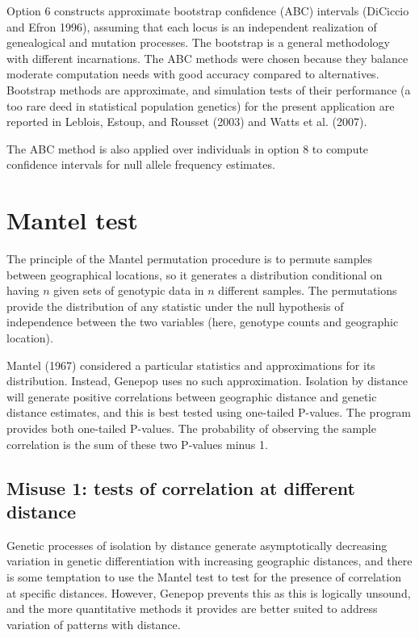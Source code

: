 \documentclass[12pt,]{book}
\theoremstyle{definition}
\theoremstyle{definition}
\theoremstyle{definition}
\theoremstyle{remark}
\begin{document}
 Option 6 constructs approximate
bootstrap confidence (ABC) intervals (DiCiccio and Efron 1996), assuming
that each locus is an independent realization of genealogical and
mutation processes. The bootstrap is a general methodology with
different incarnations. The ABC methods were chosen because they balance
moderate computation needs with good accuracy compared to alternatives.
Bootstrap methods are approximate, and simulation tests of their
performance (a too rare deed in statistical population genetics) for the
present application are reported in Leblois, Estoup, and Rousset (2003)
and Watts et al. (2007).

The ABC method is also applied over individuals in option 8 to compute
confidence intervals for null allele frequency estimates.

\section{Mantel test}\label{mantel-test}

 The principle of the Mantel permutation procedure is
to permute samples between geographical locations, so it generates a
distribution conditional on having \(n\) given sets of genotypic data in
\(n\) different samples. The permutations provide the distribution of
any statistic under the null hypothesis of independence between the two
variables (here, genotype counts and geographic location).

Mantel (1967) considered a particular statistics and approximations for
its distribution. Instead, Genepop uses no such approximation. Isolation
by distance will generate positive correlations between geographic
distance and genetic distance estimates, and this is best tested using
one-tailed P-values. The program provides both one-tailed P-values. The
probability of observing the sample correlation is the sum of these two
P-values minus 1.

\subsection{Misuse 1: tests of correlation at different
distance}\label{misuse-1-tests-of-correlation-at-different-distance}

Genetic processes of isolation by distance generate asymptotically
decreasing variation in genetic differentiation with increasing
geographic distances, and there is some temptation to use the Mantel
test to test for the presence of correlation at specific distances.
However, Genepop prevents this as this is logically unsound, and the
more quantitative methods it provides are better suited to address
variation of patterns with distance.
\end{document}

